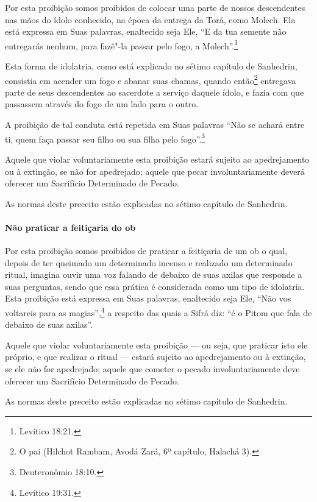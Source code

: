 \begin{multicols}{2}
Por esta proibição somos proibidos de colocar uma parte de nossos
descendentes nas mãos do ídolo conhecido, na época da entrega da Torá\starr,
como Molech\starr. Ela está expressa em Suas palavras, enaltecido seja Ele,
``E da tua semente não entregarás nenhum, para fazê"-la passar pelo fogo,
a Molech\starr''.\footnote{Levítico 18:21.}

Esta forma de idolatria, como está explicado no sétimo capítulo de
Sanhedrin\starr, consistia em acender um fogo e abanar suas chamas, quando
então\footnote{O pai (Hilchot Rambam\starr, Avodá Zará\starr, 6º capítulo, Halachá\starr{} 3).} entregava parte de seus descendentes ao
sacerdote a serviço daquele ídolo, e fazia com que passassem através do
fogo de um lado para o outro.

A proibição de tal conduta está repetida em Suas palavras ``Não se
achará entre ti, quem faça passar seu filho ou sua filha pelo fogo''.\footnote{Deuteronômio 18:10.}

Aquele que violar voluntariamente esta proibição estará sujeito ao
apedrejamento ou à extinção, se não for apedrejado; aquele que pecar
involuntariamente deverá oferecer um Sacrifício Determinado de Pecado.

As normas deste preceito estão explicadas no sétimo capítulo de Sanhedrin\starr.

\paragraph{Não praticar a feitiçaria do ob\starr}

Por esta proibição somos proibidos de praticar a feitiçaria de um ob\starr{}
o qual, depois de ter queimado um determinado incenso e realizado um
determinado ritual, imagina ouvir uma voz falando de debaixo de suas
axilas que responde a suas perguntas, sendo que essa prática é considerada como um
tipo de idolatria. Esta proibição está expressa em Suas palavras,
enaltecido seja Ele, ``Não vos voltareis para as magias'',\footnote{Levítico
19:31.} a respeito das quais a Sifrá\starr{} diz: ``é o Pitom\starr{} que fala de
debaixo de suas axilas''.

Aquele que violar voluntariamente esta proibição --- ou seja, que
praticar isto ele próprio, e que realizar o ritual --- estará sujeito ao
apedrejamento ou à extinção, se ele não for apedrejado; aquele que
cometer o pecado involuntariamente deve oferecer um Sacrifício
Determinado de Pecado.

As normas deste preceito estão explicadas no sétimo capítulo de Sanhedrin\starr.


\end{multicols}
